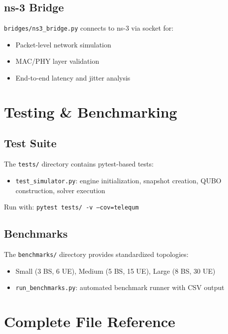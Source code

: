 \documentclass[11pt,a4paper]{article}
\begin{document}
\subsection{ns-3 Bridge}

\texttt{bridges/ns3\_bridge.py} connects to ns-3 via socket for:
\begin{itemize}
  \item Packet-level network simulation
  \item MAC/PHY layer validation
  \item End-to-end latency and jitter analysis
\end{itemize}


\section{Testing \& Benchmarking}

\subsection{Test Suite}

The \texttt{tests/} directory contains pytest-based tests:
\begin{itemize}
  \item \texttt{test\_simulator.py}: engine initialization, snapshot creation, QUBO construction, solver execution
\end{itemize}

Run with: \texttt{pytest tests/ -v --cov=telequm}

\subsection{Benchmarks}

The \texttt{benchmarks/} directory provides standardized topologies:
\begin{itemize}
  \item Small (3 BS, 6 UE), Medium (5 BS, 15 UE), Large (8 BS, 30 UE)
  \item \texttt{run\_benchmarks.py}: automated benchmark runner with CSV output
\end{itemize}


\section{Complete File Reference}
\end{document}

